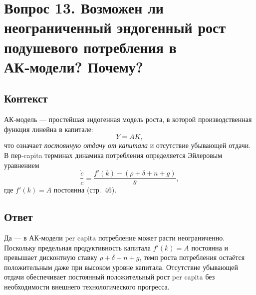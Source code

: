 \section*{Вопрос 13. Возможен ли неограниченный эндогенный рост подушевого потребления в АК‑модели? Почему?}

\subsection*{Контекст}
АК‑модель — простейшая эндогенная модель роста, в которой производственная функция линейна в капитале: 
\[
Y = A K,
\]
что означает \emph{постоянную отдачу от капитала} и отсутствие убывающей отдачи. В пер‑capita терминах динамика 
потребления определяется Эйлеровым уравнением
\[
\frac{\dot c}{c} = \frac{f'(k) - (\rho + \delta + n + g)}{\theta},
\]
где \(f'(k)=A\) постоянна (стр.~46).

\subsection*{Ответ}
Да — в АК‑модели per capita потребление может расти неограниченно. Поскольку предельная продуктивность капитала 
\(f'(k)=A\) постоянна и превышает дисконтную ставку \(\rho + \delta + n + g\), темп роста потребления остаётся 
положительным даже при высоком уровне капитала. Отсутствие убывающей отдачи обеспечивает постоянный положительный 
рост per capita без необходимости внешнего технологического прогресса.
